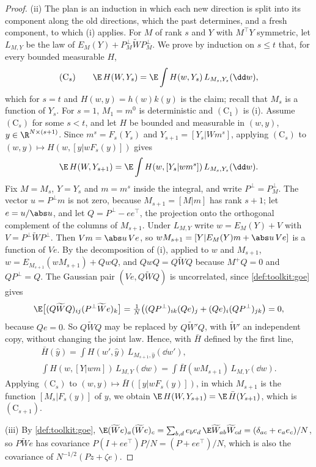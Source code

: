 \begin{refsection}
\begin{proof}
(ii) The plan is an induction in which each new direction is split into its component along the old directions, which the past determines, and a fresh component, to which (i) applies. For $M$ of rank $s$ and $Y$ with $M^\top Y$ symmetric, let $L_{M,Y}$ be the law of $E_M(Y)+P_M^\perp\widetilde WP_M^\perp$. We prove by induction on $s\le t$ that, for every bounded measurable $H$,
\[
(\mathrm C_s)\qquad\E\,H(W,Y_s)=\E\int H(w,Y_s)\,L_{M_s,Y_s}(\dd w),
\]
which for $s=t$ and $H(w,y)=h(w)k(y)$ is the claim; recall that $M_s$ is a function of $Y_s$. For $s=1$, $M_1=m^0$ is deterministic and $(\mathrm C_1)$ is (i). Assume $(\mathrm C_s)$ for some $s<t$, and let $H$ be bounded and measurable in $(w,y)$, $y\in\R^{N\times(s+1)}$. Since $m^s=F_s(Y_s)$ and $Y_{s+1}=[Y_s|Wm^s]$, applying $(\mathrm C_s)$ to $(w,y)\mapsto H(w,[y|wF_s(y)])$ gives
\[
\E\,H(W,Y_{s+1})=\E\int H(w,[Y_s|wm^s])\,L_{M_s,Y_s}(\dd w).
\]
Fix $M=M_s$, $Y=Y_s$ and $m=m^s$ inside the integral, and write $P^\perp=P^\perp_M$. The vector $u=P^\perp m$ is not zero, because $M_{s+1}=[M|m]$ has rank $s+1$; let $e=u/\abs u$, and let $Q=P^\perp-ee^\top$, the projection onto the orthogonal complement of the columns of $M_{s+1}$. Under $L_{M,Y}$ write $w=E_M(Y)+V$ with $V=P^\perp\widetilde WP^\perp$. Then $Vm=\abs u\,Ve$, so $wM_{s+1}=[Y|E_M(Y)m+\abs u\,Ve]$ is a function of $Ve$. By the decomposition of (i), applied to $w$ and $M_{s+1}$, $w=E_{M_{s+1}}(wM_{s+1})+QwQ$, and $QwQ=Q\widetilde WQ$ because $M^+Q=0$ and $QP^\perp=Q$. The Gaussian pair $(Ve,Q\widetilde WQ)$ is uncorrelated, since \cref{def:toolkit:goe} gives
\[
\E\bigl[(Q\widetilde WQ)_{ij}(P^\perp\widetilde We)_k\bigr]=\tfrac1N\bigl((QP^\perp)_{ik}(Qe)_j+(Qe)_i(QP^\perp)_{jk}\bigr)=0,
\]
because $Qe=0$. So $Q\widetilde WQ$ may be replaced by $Q\widetilde W'Q$, with $\widetilde W'$ an independent copy, without changing the joint law. Hence, with $\bar H$ defined by the first line,
\begin{gather*}
\bar H(\hat y)=\int H(w',\hat y)\,L_{M_{s+1},\hat y}(\dd w'),\\
\int H(w,[Y|wm])\,L_{M,Y}(\dd w)=\int\bar H(wM_{s+1})\,L_{M,Y}(\dd w).
\end{gather*}
Applying $(\mathrm C_s)$ to $(w,y)\mapsto\bar H([y|wF_s(y)])$, in which $M_{s+1}$ is the function $[M_s|F_s(y)]$ of $y$, we obtain $\E\,H(W,Y_{s+1})=\E\,\bar H(Y_{s+1})$, which is $(\mathrm C_{s+1})$.

(iii) By \cref{def:toolkit:goe}, $\E(\widetilde We)_a(\widetilde We)_c=\sum_{b,d}e_be_d\,\E\widetilde W_{ab}\widetilde W_{cd}=(\delta_{ac}+e_ae_c)/N$, so $P\widetilde We$ has covariance $P(I+ee^\top)P/N=(P+ee^\top)/N$, which is also the covariance of $N^{-1/2}(Pz+\zeta e)$.


\end{proof}
\end{refsection}
